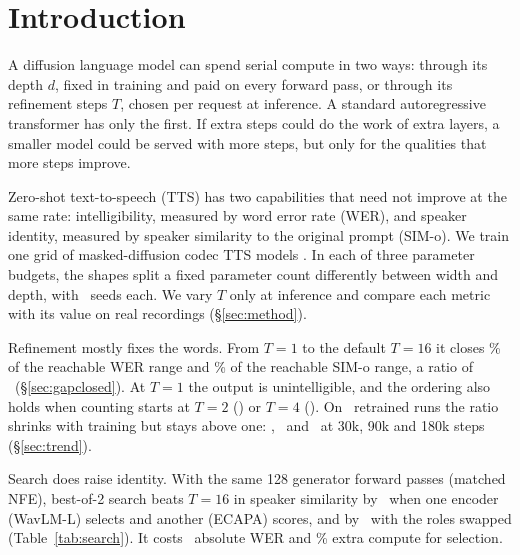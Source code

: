 \section{Introduction}
A diffusion language model can spend serial compute in two ways: through its depth $d$,
fixed in training and paid on every forward pass, or through its refinement steps $T$,
chosen per request at inference. A standard autoregressive transformer has only the first.
If extra steps could do the work of extra layers, a smaller model could be served with more
steps, but only for the qualities that more steps improve.

Zero-shot text-to-speech (TTS) has two capabilities that need not improve at the same rate:
intelligibility, measured by word error rate (WER), and speaker identity, measured by speaker
similarity to the original prompt (SIM-o). We train one grid of masked-diffusion codec TTS
models \citep{soundstorm,maskgct}. In each of three parameter budgets, the shapes split a fixed
parameter count differently between width and depth, with \Nseeds\ seeds each. We vary $T$
only at inference and compare each metric with its value on real recordings
(\S\ref{sec:method}).

Refinement mostly fixes the words. From $T{=}1$ to the default $T{=}16$ it closes \NgapWER\%
of the reachable WER range and \NgapSIM\% of the reachable SIM-o range, a ratio of
\NgapRatio\ (\S\ref{sec:gapclosed}). At $T{=}1$ the output is unintelligible, and the
ordering also holds when counting starts at $T{=}2$ (\NcrsFromTwoRatio) or $T{=}4$
(\NcrsFromFourRatio). On \NtrendRuns\
retrained runs the ratio shrinks with training but stays above one: \NgapThirtykRatio,
\NgapNinetykRatio\ and \NgapEightykRatio\ at 30k, 90k and 180k steps (\S\ref{sec:trend}).

Search does raise identity. With the same 128 generator forward passes (matched NFE),
best-of-2 search beats $T{=}16$ in speaker similarity by \NcrMatchLod\ when one encoder
(WavLM-L) selects and another (ECAPA) scores, and by \NcrXEWLod\ with the roles swapped
(Table~\ref{tab:search}). It costs \NcrLedgerSearchWER\ absolute WER and \NcrCostTwopct\%
extra compute for selection.

